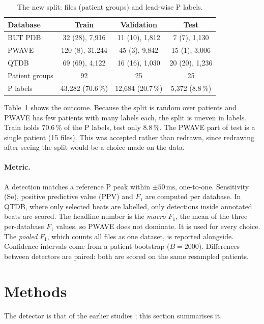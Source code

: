 \documentclass[11pt,a4paper]{article}
\newcommand{\ms}{\,\mathrm{ms}}
\begin{document}
\begin{table}[ht]
\centering
\caption{The new split: files (patient groups) and lead-wise P labels.}
\label{tab:split}
\begin{tabular}{lccc}
\toprule
Database & Train & Validation & Test \\
\midrule
BUT PDB & 32 (28), 7,916 & 11 (10), 1,812 & 7 (7), 1,130 \\
PWAVE & 120 (8), 31,244 & 45 (3), 9,842 & 15 (1), 3,006 \\
QTDB & 69 (69), 4,122 & 16 (16), 1,030 & 20 (20), 1,236 \\
\midrule
Patient groups & 92 & 25 & 25 \\
P labels & 43,282 (70.6\,\%) & 12,684 (20.7\,\%) & 5,372 (8.8\,\%) \\
\bottomrule
\end{tabular}
\end{table}

Table~\ref{tab:split} shows the outcome. Because the split is random over patients and PWAVE has few patients with many labels each, the split is uneven in labels. Train holds 70.6\,\% of the P labels, test only 8.8\,\%. The PWAVE part of test is a single patient (15 files). This was accepted rather than redrawn, since redrawing after seeing the split would be a choice made on the data.

\paragraph{Metric.} A detection matches a reference P peak within $\pm50\ms$, one-to-one. Sensitivity (Se), positive predictive value (PPV) and $F_1$ are computed per database. In QTDB, where only selected beats are labelled, only detections inside annotated beats are scored. The headline number is the \emph{macro} $F_1$, the mean of the three per-database $F_1$ values, so PWAVE does not dominate. It is used for every choice. The \emph{pooled} $F_1$, which counts all files as one dataset, is reported alongside. Confidence intervals come from a patient bootstrap ($B = 2000$). Differences between detectors are paired: both are scored on the same resampled patients.

\section{Methods}

The detector is that of the earlier studies \cite{prev,prevcnn}; this section summarises it.
\end{document}
